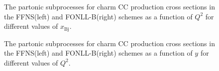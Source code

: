 \documentclass[pdftex,twocolumn,epjc3]{svjour3}          %
\newcommand{\xbj}{\ensuremath{x_{\text{Bj}}}\xspace}
\newcommand{\fonll} {{FONLL-B}\xspace}
\newcommand{\ffns} {{FFNS}\xspace}
\begin{document}
\begin{figure}
    \centering
    \caption{The partonic subprocesses for charm CC production cross sections in the \ffns (left) and \fonll (right) schemes as a function of $Q^2$ for different values of \xbj.}
    \label{fig:partonic-q2}
\end{figure}

\begin{figure}
    \centering
    \caption{The partonic subprocesses for charm CC production cross sections in the \ffns (left) and \fonll (right) schemes as a function of $y$ for different values of $Q^2$.}
    \label{fig:partonic-y}
\end{figure}
\end{document}
